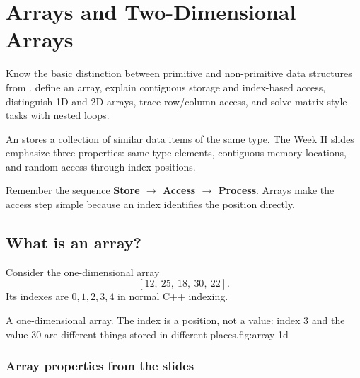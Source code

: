 \chapter{Arrays and Two-Dimensional Arrays}\label{ch:arrays}

\chapterguide%
  {Know the basic distinction between primitive and non-primitive data structures from .}
  {define an array, explain contiguous storage and index-based access, distinguish 1D and 2D arrays, trace row/column access, and solve matrix-style tasks with nested loops.}

An  stores a collection of similar data items of the same type. The Week II slides emphasize three properties: same-type elements, contiguous memory locations, and random access through index positions.

\begin{firstread}
Remember the sequence \textbf{Store $\rightarrow$ Access $\rightarrow$ Process}. Arrays make the access step simple because an index identifies the position directly.
\end{firstread}

\section{What is an array?}

Consider the one-dimensional array
\[
[12,\ 25,\ 18,\ 30,\ 22].
\]
Its indexes are $0,1,2,3,4$ in normal C++ indexing.

\begin{utpfig}{A one-dimensional array. The index is a position, not a value: index 3 and
the value 30 are different things stored in different places.}{fig:array-1d}
\end{utpfig}

\subsection{Array properties from the slides}

